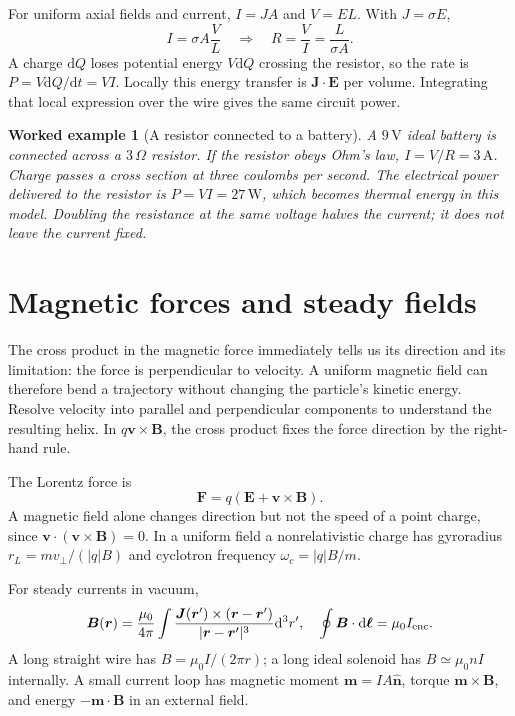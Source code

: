 \documentclass[11pt,oneside]{book}
\newcommand{\dd}{\mathrm{d}}
\newcommand{\vect}[1]{\boldsymbol{#1}}
\newcommand{\mun}{\mu_0}
\theoremstyle{reviewstyle}
\newtheorem{example}{Worked example}[chapter]
\begin{document}
For uniform axial fields and current, $I=JA$ and $V=EL$. With $J=\sigma E$,
\begin{equation}
I=\sigma A\frac VL\quad\Longrightarrow\quad R=\frac VI=\frac{L}{\sigma A}.
\end{equation}
A charge $\dd Q$ loses potential energy $V\dd Q$ crossing the resistor, so the rate is $P=V\dd Q/\dd t=VI$. Locally this energy transfer is $\vect J\cdot\vect E$ per volume. Integrating that local expression over the wire gives the same circuit power.

\begin{example}[A resistor connected to a battery]
A $9\,\mathrm V$ ideal battery is connected across a $3\,\Omega$ resistor. If the resistor obeys Ohm's law, $I=V/R=3\,\mathrm A$. Charge passes a cross section at three coulombs per second. The electrical power delivered to the resistor is $P=VI=27\,\mathrm W$, which becomes thermal energy in this model. Doubling the resistance at the same voltage halves the current; it does not leave the current fixed.
\end{example}

\section{Magnetic forces and steady fields}
The cross product in the magnetic force immediately tells us its direction and its limitation: the force is perpendicular to velocity. A uniform magnetic field can therefore bend a trajectory without changing the particle's kinetic energy. Resolve velocity into parallel and perpendicular components to understand the resulting helix. In $q\vect v\times\vect B$, the cross product fixes the force direction by the right-hand rule.

The Lorentz force is
\begin{equation}\vect F=q(\vect E+\vect v\times\vect B).\end{equation}
A magnetic field alone changes direction but not the speed of a point charge, since $\vect v\cdot(\vect v\times\vect B)=0$. In a uniform field a nonrelativistic charge has gyroradius $r_L=mv_\perp/(|q|B)$ and cyclotron frequency $\omega_c=|q|B/m$.

For steady currents in vacuum,
\begin{equation}
\vect B(\vect r)=\frac{\mun}{4\pi}\int\frac{\vect J(\vect r')\times(\vect r-\vect r')}{|\vect r-\vect r'|^3}\dd^3r',
\quad \oint\vect B\cdot\dd\vect\ell=\mun I_{\rm enc}.
\end{equation}
A long straight wire has $B=\mun I/(2\pi r)$; a long ideal solenoid has $B\simeq\mun nI$ internally. A small current loop has magnetic moment $\vect m=IA\hat{\vect n}$, torque $\vect m\times\vect B$, and energy $-\vect m\cdot\vect B$ in an external field.
\end{document}
